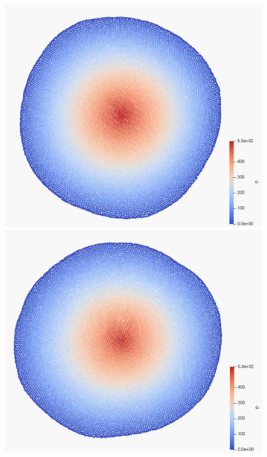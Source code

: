 		\begin{figure} \centering
			\begin{minipage}{.3 \linewidth} \centering
				\includegraphics[clip, width=\linewidth]{img/mpsgc_10.png}
			\end{minipage}
			\begin{minipage}{.3 \linewidth} \centering
				\includegraphics[clip, width=\linewidth]{img/mpsgc_30.png}

\end{minipage}
\end{figure}
